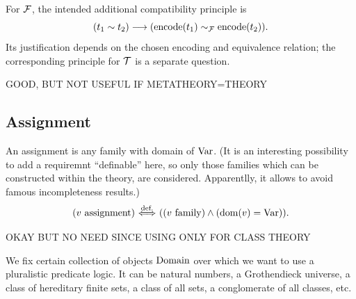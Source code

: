 For ${\mathcal{F}}$, the intended additional compatibility principle is
\[
(t_1 \sim t_2)
\longrightarrow
({\text{encode}}(t_1) \sim_{\mathcal{F}} {\text{encode}}(t_2)).
\]
Its justification depends on the chosen encoding and equivalence relation;
the corresponding principle for $\mathcal{T}$ is a separate question.%

\iffalse GOOD, BUT NOT USEFUL IF METATHEORY=THEORY


\subsection{Assignment}
\begin{definition}[assignment]%
An assignment is any family with domain of $\mathrm{Var}$. (It is an interesting possibility to add a requiremnt ``definable'' here, so only those families which can be constructed within the theory, are considered. Apparentlly, it allows to avoid famous incompleteness results.)\\
\[
(v\mathrm{\ assignment}) \ {\stackrel{{\textrm{def.}}}{\Longleftrightarrow}}\  ((v\mathrm{\ family}) \land (\mathrm{dom}(v)=\mathrm{Var})).
\]%
\end{definition}





\iffalse OKAY BUT NO NEED SINCE USING ONLY FOR CLASS THEORY
\begin{parameter}%
We fix certain collection of objects $\mathrm{Domain}$ over which we want to use a pluralistic predicate logic. It can be natural numbers, a Grothendieck universe, a class of hereditary finite sets, a class of all sets, a conglomerate of all classes, etc.
\end{parameter}

